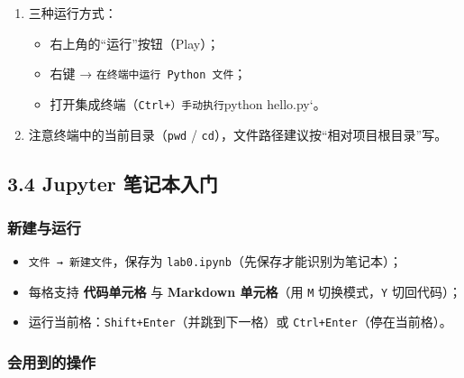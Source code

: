 \begin{Shaded}
\begin{Highlighting}[]
\NormalTok{(}\NormalTok{)}
\NormalTok{(} \OperatorTok{**} \NormalTok{)}
\end{Highlighting}
\end{Shaded}

\begin{enumerate}
\def\labelenumi{\arabic{enumi}.}
\setcounter{enumi}{1}
\tightlist
\item
  三种运行方式：

  \begin{itemize}
  \tightlist
  \item
    右上角的``运行''按钮（Play）；
  \item
    右键 → \texttt{在终端中运行\ Python\ 文件}；
  \item
    打开集成终端（\texttt{Ctrl+\textasciigrave{}\textasciigrave{}）手动执行}python
    hello.py`。
  \end{itemize}
\item
  注意终端中的当前目录（\texttt{pwd} /
  \texttt{cd}），文件路径建议按``相对项目根目录''写。
\end{enumerate}

\subsection{3.4 Jupyter
笔记本入门}\label{jupyter-ux7b14ux8bb0ux672cux5165ux95e8}

\subsubsection{新建与运行}\label{ux65b0ux5efaux4e0eux8fd0ux884c}

\begin{itemize}
\tightlist
\item
  \texttt{文件\ →\ 新建文件}，保存为
  \texttt{lab0.ipynb}（先保存才能识别为笔记本）；
\item
  每格支持 \textbf{代码单元格} 与 \textbf{Markdown 单元格}（用
  \texttt{M} 切换模式，\texttt{Y} 切回代码）；
\item
  运行当前格：\texttt{Shift+Enter}（并跳到下一格）或
  \texttt{Ctrl+Enter}（停在当前格）。
\end{itemize}

\subsubsection{会用到的操作}\label{ux4f1aux7528ux5230ux7684ux64cdux4f5c}

